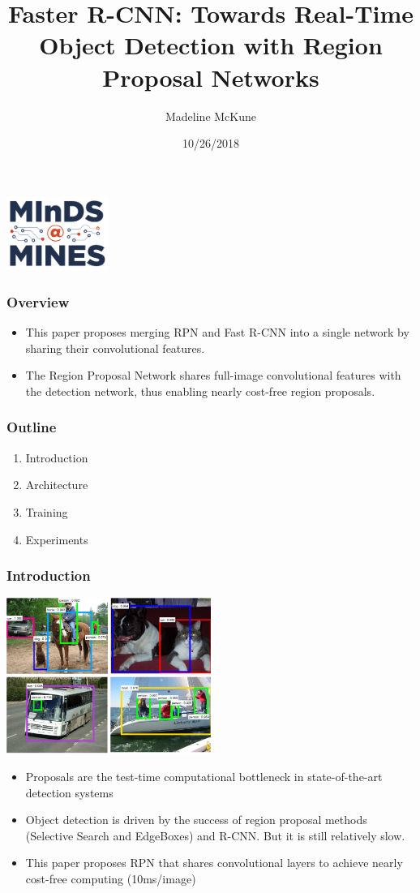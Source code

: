 \documentclass{beamer}
\title[frcnn]{Faster R-CNN: Towards Real-Time Object Detection with Region Proposal Networks}
\author{Madeline McKune}
\institute[CSM]{Colorado School of Mines}
\date{10/26/2018}
\begin{document}
    {
    \begin{frame}[plain]
        \titlepage
        \centering
            \includegraphics[width=0.25\textwidth]{images/logo.png}
    \end{frame}
    }

    \begin{frame}
        \frametitle{Overview}
          \begin{itemize}
              \item This paper proposes merging RPN and Fast R-CNN into a single network by sharing their convolutional features.
              \item The Region Proposal Network shares full-image convolutional features with the detection network, thus enabling nearly cost-free region proposals.
          \end{itemize}
    \end{frame}

    \begin{frame}
       \frametitle{Outline}
         \begin{enumerate}
             \item Introduction
             \item Architecture
             \item Training
             \item Experiments
         \end{enumerate}
    \end{frame}
    
    \begin{frame}
       \frametitle{Introduction}
       \centering
        \includegraphics[width=0.5\textwidth]{images/bus.png}
       \begin{itemize}
           \item Proposals are the test-time computational bottleneck in state-of-the-art detection systems
           \item Object detection is driven by the success of region proposal methods (Selective Search and EdgeBoxes) and R-CNN. But it is still relatively slow.
           \item This paper proposes RPN that shares convolutional layers to achieve nearly cost-free computing (10ms/image)
       \end{itemize}
    \end{frame}
\end{document}
